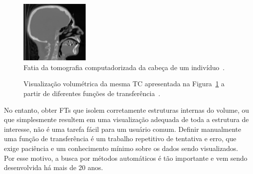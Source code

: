 \begin{figure}[h]
	\centering
	\includegraphics[width=0.3\textwidth]{images/head_ct_slice_intro}
    \caption{Fatia da tomografia computadorizada da cabeça de um indivíduo~\cite{gordonms}.}
    \label{fig:head_ct_slice_intro}
\end{figure}
\begin{figure}[h]
	\centering
    \caption{Visualização volumétrica da mesma TC apresentada na Figura~\ref{fig:head_ct_slice_intro} a partir de diferentes funções de transferência~\cite{gordonms}.}
    \label{fig:head_skull_intro}
\end{figure}
    
    No entanto, obter FTs que isolem corretamente estruturas internas do volume, ou que simplesmente resultem em uma visualização adequada de toda a estrutura de interesse, não é uma tarefa fácil para um usuário comum. Definir manualmente uma função de transferência é um trabalho repetitivo de tentativa e erro, que exige paciência e um conhecimento mínimo sobre os dados sendo visualizados. Por esse motivo, a busca por métodos automáticos é tão importante e vem sendo desenvolvida há mais de 20 anos.
    
